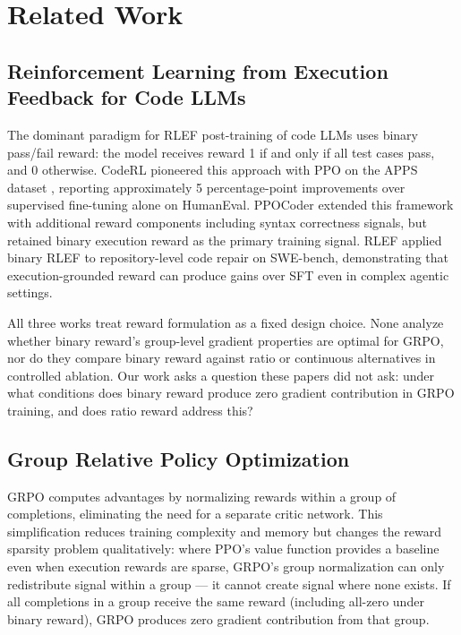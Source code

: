 \section{Related Work}
\label{sec:related}

\subsection{Reinforcement Learning from Execution Feedback for Code LLMs}

The dominant paradigm for RLEF post-training of code LLMs uses binary pass/fail reward: the model receives reward 1 if and only if all test cases pass, and 0 otherwise. CodeRL \citep{le2022coderl} pioneered this approach with PPO on the APPS dataset \citep{hendrycks2021apps}, reporting approximately 5 percentage-point improvements over supervised fine-tuning alone on HumanEval. PPOCoder \citep{shojaee2023ppocoder} extended this framework with additional reward components including syntax correctness signals, but retained binary execution reward as the primary training signal. RLEF \citep{gehring2024rlef} applied binary RLEF to repository-level code repair on SWE-bench, demonstrating that execution-grounded reward can produce gains over SFT even in complex agentic settings.

All three works treat reward formulation as a fixed design choice. None analyze whether binary reward's group-level gradient properties are optimal for GRPO, nor do they compare binary reward against ratio or continuous alternatives in controlled ablation. Our work asks a question these papers did not ask: under what conditions does binary reward produce zero gradient contribution in GRPO training, and does ratio reward address this?

\subsection{Group Relative Policy Optimization}

GRPO \citep{shao2024deepseekmath} computes advantages by normalizing rewards within a group of completions, eliminating the need for a separate critic network. This simplification reduces training complexity and memory but changes the reward sparsity problem qualitatively: where PPO's value function provides a baseline even when execution rewards are sparse, GRPO's group normalization can only redistribute signal within a group --- it cannot create signal where none exists. If all completions in a group receive the same reward (including all-zero under binary reward), GRPO produces zero gradient contribution from that group.

